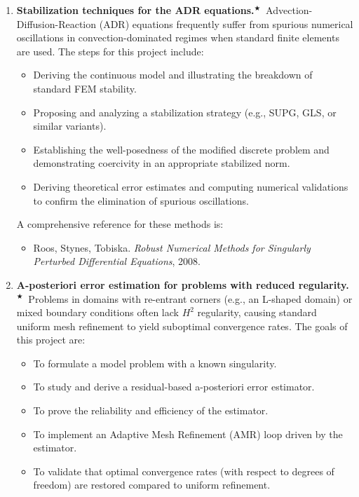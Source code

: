 \documentclass{article}
\newcommand{\master}{$^\bigstar$}
\begin{document}
\begin{enumerate}
    \item \textbf{Stabilization techniques for the ADR equations.}\master\ Advection-Diffusion-Reaction (ADR) equations frequently suffer from spurious numerical oscillations in convection-dominated regimes when standard finite elements are used. 
    The steps for this project include:
        \begin{itemize}
            \item Deriving the continuous model and illustrating the breakdown of standard FEM stability.
            \item Proposing and analyzing a stabilization strategy (e.g., SUPG, GLS, or similar variants).
            \item Establishing the well-posedness of the modified discrete problem and demonstrating coercivity in an appropriate stabilized norm.
            \item Deriving theoretical error estimates and computing numerical validations to confirm the elimination of spurious oscillations.
        \end{itemize}
        A comprehensive reference for these methods is:
        \begin{itemize}
            \item Roos, Stynes, Tobiska. \emph{Robust Numerical Methods for Singularly Perturbed Differential Equations}, 2008.
        \end{itemize}
    \item \textbf{A-posteriori error estimation for problems with reduced regularity.}\master\ Problems in domains with re-entrant corners (e.g., an L-shaped domain) or mixed boundary conditions often lack $H^2$ regularity, causing standard uniform mesh refinement to yield suboptimal convergence rates. The goals of this project are:
        \begin{itemize}
            \item To formulate a model problem with a known singularity.
            \item To study and derive a residual-based a-posteriori error estimator.
            \item To prove the reliability and efficiency of the estimator.
            \item To implement an Adaptive Mesh Refinement (AMR) loop driven by the estimator.
            \item To validate that optimal convergence rates (with respect to degrees of freedom) are restored compared to uniform refinement.
        \end{itemize}


\end{enumerate}
\end{document}
